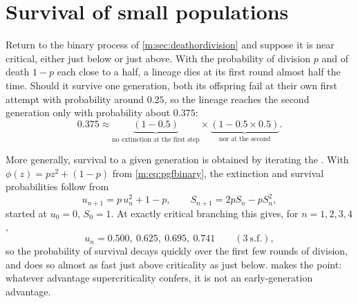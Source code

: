 \section{Survival of small populations}
\label{m:sec:small}

Return to the binary process of \cref{m:sec:deathordivision} and suppose it is near
critical, either just below or just above. With the probability of division $p$ and
of death $1-p$ each close to a half, a lineage dies at its first round almost half
the time. Should it survive one generation, both its offspring fail at their own
first attempt with probability around $0.25$, so the lineage reaches the second
generation only with probability about $0.375$:
\begin{equation*}
0.375 \approx
\underbrace{(1-0.5)}_{\text{no extinction at the first step}}\times
\underbrace{(1-0.5\times0.5)}_{\text{nor at the second}} .
\end{equation*}

More generally, survival to a given generation is obtained by iterating the \pgf{}.
With $\phi(z)=pz^2+(1-p)$ from \cref{m:eq:pgfbinary}, the extinction and survival
probabilities follow from
\begin{equation}
\label{m:eq:ext}
u_{n+1} = p\,u_n^2 + 1-p,
\qquad
S_{n+1} = 2pS_n - pS_n^2 ,
\end{equation}
started at $u_0=0$, $S_0=1$. At exactly critical branching this gives, for
$n=1,2,3,4$,
\begin{equation*}
u_n = 0.500,\ 0.625,\ 0.695,\ 0.741\qquad(3\ \text{s.f.}),
\end{equation*}
so the probability of survival decays quickly over the first few rounds of
division, and does so almost as fast just above criticality as just below.
 makes the point: whatever advantage supercriticality confers, it
is not an early-generation advantage.

